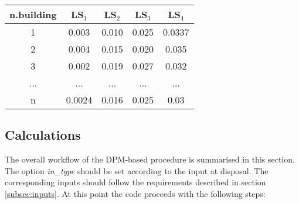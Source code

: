 \begin{table}[h]
\centering
\begin{tabular}{|c|c|c|c|c|} \hline
\textbf{n.building} & \textbf{LS$_1$} & \textbf{LS$_2$} & \textbf{LS$_3$} & \textbf{LS$_4$} \\ \hline
1 & 0.003 &	0.010 &	0.025 &	0.0337\\ \hline
2 & 0.004 &	0.015 &	0.020 &	0.035\\ \hline
3 & 0.002 &	0.019 &	0.027 &	0.032\\ \hline
... & ... & ... & ... & ...\\ \hline
n & 0.0024 &	0.016 &	0.025 &	0.03\\ \hline
\end{tabular}
\end{table}

\subsection{Calculations}
The overall workflow of the DPM-based procedure is summarised in this section. The option \textit{in\_type} should be set according to the input at disposal. The corresponding inputs should follow the requirements described in section \ref{subsec:inputs}. At this point the code proceeds with the following steps:

